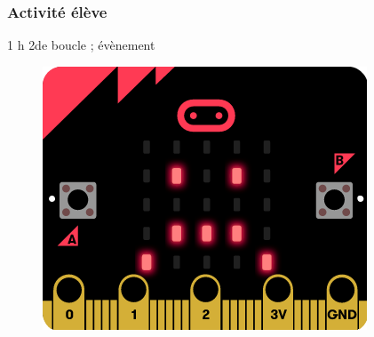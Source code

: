 \subsubsection{Activité élève}

\cartouche
{1 h}         %
{2de}           %
{}        %
{}     %
{boucle ; évènement}       %


\begin{figure}
    \includegraphics[width=\linewidth]{res/mb_smiley03.png}
\end{figure}

